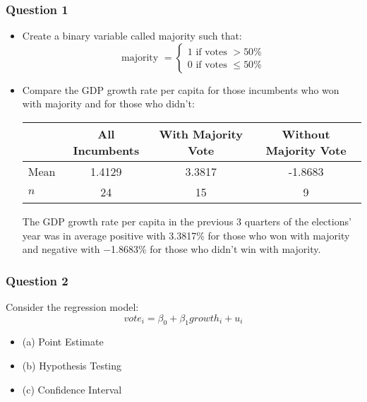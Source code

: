 \documentclass[11pt, xcolor=x11names,compress]{beamer}
\begin{document}
\begin{frame}[fragile,t]
\frametitle{Question 1} \label{(a1)}
\begin{itemize}
    \item Create a binary variable called majority such that:
$$
\text { majority }=\left\{\begin{array}{l}
1 \text { if votes }>50 \% \\
0 \text { if votes } \leq 50 \%
\end{array}\right.
$$
\item Compare the GDP growth rate per capita for those
incumbents who won with majority and for those who didn’t:
\pause
\vspace{3mm}
\begin{center}
\setlength{\tabcolsep}{3pt}
\begin{tabular}{|l|c|c|c|}
\hline
& All Incumbents & With Majority Vote & Without Majority Vote
\\
\hline
Mean &  1.4129 & 3.3817  & -1.8683 \\
 \hline 
$n$ & 24 & 15 & 9
\\ \hline
\end{tabular}
\end{center}
\vspace{3mm}
The GDP growth rate per capita in the previous 3 quarters of the elections’ year was in average positive with 3.3817\% for those who won with majority and negative with −1.8683\% for those who didn’t win with majority.
\end{itemize}
\end{frame}
\begin{frame}[fragile,t]
\frametitle{Question 2}
Consider the regression model:
$$
vote_i = \beta_0 + \beta_1 growth_i + u_i
$$

\begin{itemize}
    \item (a) Point Estimate  
    \item (b) Hypothesis Testing
    \item (c) Confidence Interval 
\end{itemize}
\end{frame}
\end{document}

